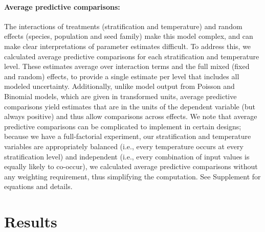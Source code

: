 \documentclass[11pt]{article}\usepackage[]{graphicx}\usepackage[]{color}
\begin{document}
	\paragraph{Average predictive comparisons:} The interactions of treatments (stratification and temperature) and random effects (species, population and seed family) make this model complex, and can make clear interpretations of parameter estimates difficult. To address this, we calculated average predictive comparisons \parencite{Gelman2007} for each stratification and  temperature level. These estimates average over interaction terms and the full mixed (fixed and random) effects, to provide a single estimate per level that includes all modeled uncertainty. Additionally, unlike model output from Poisson and Binomial models, which are given in transformed units, average predictive comparisons yield estimates that are in the units of the dependent variable (but always positive) \parencite{Gelman2007} and thus allow comparisons across effects. We note that average predictive comparisons can be complicated to implement in certain designs; because we have a full-factorial experiment, our stratification and temperature variables are appropriately balanced (i.e., every temperature occurs at every stratification level) and independent (i.e., every combination of input values is equally likely to co-occur), we calculated average predictive comparisons without any weighting requirement, thus simplifying the computation. See Supplement for equations and details. %

	\section{Results} 
		
\end{document}
